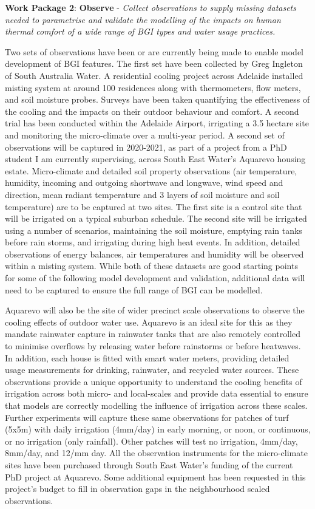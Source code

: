 \textbf{Work Package 2}: \textbf{Observe} - \emph{Collect observations to supply missing datasets needed to parametrise and validate the modelling of the impacts on human thermal comfort of a wide range of BGI types and water usage practices.}


Two sets of observations have been or are currently being made to enable model development of BGI features. The first set have been collected by Greg Ingleton of South Australia Water. A residential cooling project across Adelaide installed misting system at around 100 residences along with thermometers, flow meters, and soil moisture probes. Surveys have been taken quantifying the effectiveness of the cooling and the impacts on their outdoor behaviour and comfort. A second trial has been conducted within the Adelaide Airport, irrigating a 3.5 hectare site and monitoring the micro-climate over a multi-year period. A second set of observations will be captured in 2020-2021, as part of a project from a PhD student I am currently supervising, across South East Water's Aquarevo housing estate. Micro-climate and detailed soil property observations (air temperature, humidity, incoming and outgoing shortwave and longwave, wind speed and direction, mean radiant temperature and 3 layers of soil moisture and soil temperature) are  to be captured at two sites. The first site is a control site that will be irrigated on a typical suburban schedule. The second site will be irrigated using a number of scenarios, maintaining the soil moisture, emptying rain tanks before rain storms, and irrigating during high heat events. In addition, detailed observations of energy balances, air temperatures and humidity will be observed within a misting system. While both of these datasets are good starting points for some of the following model development and validation, additional data will need to be captured to ensure the full range of BGI can be modelled.

Aquarevo will also be the site of wider precinct scale observations to observe the cooling effects of outdoor water use. Aquarevo is an ideal site for this as they mandate rainwater capture in rainwater tanks that are also remotely controlled to minimise overflows by releasing water before rainstorms or before heatwaves. In addition, each house is fitted with smart water meters, providing detailed usage measurements for drinking, rainwater, and recycled water sources. These observations provide a unique opportunity to understand the cooling benefits of irrigation across both micro- and local-scales and provide data essential to ensure that models are correctly modelling the influence of irrigation across these scales. Further experiments will capture these same observations for patches of turf (5x5m) with daily irrigation (4mm/day) in early morning, or noon, or continuous, or no irrigation (only rainfall). Other patches will test no irrigation, 4mm/day, 8mm/day, and 12/mm day. All the observation instruments for the micro-climate sites have been purchased through South East Water's funding of the current PhD project at Aquarevo. Some additional equipment has been requested in this project's budget to fill in observation gaps in the neighbourhood scaled observations.

